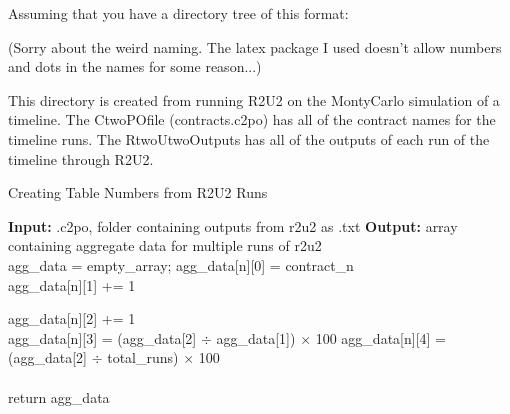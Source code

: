 \documentclass{article}
\begin{document}
Assuming that you have a directory tree of this format:\\


(Sorry about the weird naming. The latex package I used doesn't allow numbers and dots in the names for some reason...)

This directory is created from running R2U2 on the MontyCarlo simulation of a timeline. The CtwoPOfile (contracts.c2po) has all of the contract names for the timeline runs. The RtwoUtwoOutputs has all of the outputs of each run of the timeline through R2U2.





    \begin{algorithm}
        \caption{Creating Table Numbers from R2U2 Runs}\label{alg:cap}
        \begin{algorithmic}
            \State\noindent\textbf{Input: } .c2po, folder containing outputs from r2u2 as .txt
            \State\noindent\textbf{Output: } array containing aggregate data for multiple runs of r2u2
            \\
            \State agg\_data = empty\_array; 
                \State agg\_data[n][0] = contract\_n 
            \EndWhile
            \\
                    \State agg\_data[n][1] += 1 
                    \EndIf

                    \State agg\_data[n][2] += 1 
                    \EndIf
                \EndFor    
            \EndWhile
            \\ 
                \State agg\_data[n][3] = (agg\_data[2] $\div$ agg\_data[1]) $\times$ 100 
                \State agg\_data[n][4] = (agg\_data[2] $\div$ total\_runs) $\times$ 100 
            \EndFor
                \\ \\
            \Return return agg\_data

            
        \end{algorithmic}
    \end{algorithm}
\end{document}
